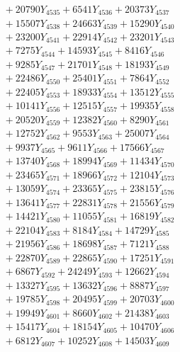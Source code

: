 \documentclass[a4paper,10pt]{article}
\begin{document}
{\begin{align}
&\;  + 20790 Y_{4535} + 6541 Y_{4536} + 20373 Y_{4537} \\[0.3ex]
&\;  + 15507 Y_{4538} + 24663 Y_{4539} + 15290 Y_{4540} \\[0.3ex]
&\;  + 23200 Y_{4541} + 22914 Y_{4542} + 23201 Y_{4543} \\[0.3ex]
&\;  + 7275 Y_{4544} + 14593 Y_{4545} + 8416 Y_{4546} \\[0.3ex]
&\;  + 9285 Y_{4547} + 21701 Y_{4548} + 18193 Y_{4549} \\[0.3ex]
&\;  + 22486 Y_{4550} + 25401 Y_{4551} + 7864 Y_{4552} \\[0.3ex]
&\;  + 22405 Y_{4553} + 18933 Y_{4554} + 13512 Y_{4555} \\[0.3ex]
&\;  + 10141 Y_{4556} + 12515 Y_{4557} + 19935 Y_{4558} \\[0.5ex]\allowbreak
&\;  + 20520 Y_{4559} + 12382 Y_{4560} + 8290 Y_{4561} \\[0.3ex]
&\;  + 12752 Y_{4562} + 9553 Y_{4563} + 25007 Y_{4564} \\[0.3ex]
&\;  + 9937 Y_{4565} + 9611 Y_{4566} + 17566 Y_{4567} \\[0.3ex]
&\;  + 13740 Y_{4568} + 18994 Y_{4569} + 11434 Y_{4570} \\[0.3ex]
&\;  + 23465 Y_{4571} + 18966 Y_{4572} + 12104 Y_{4573} \\[0.3ex]
&\;  + 13059 Y_{4574} + 23365 Y_{4575} + 23815 Y_{4576} \\[0.3ex]
&\;  + 13641 Y_{4577} + 22831 Y_{4578} + 21556 Y_{4579} \\[0.3ex]
&\;  + 14421 Y_{4580} + 11055 Y_{4581} + 16819 Y_{4582} \\[0.3ex]
&\;  + 22104 Y_{4583} + 8184 Y_{4584} + 14729 Y_{4585} \\[0.3ex]
&\;  + 21956 Y_{4586} + 18698 Y_{4587} + 7121 Y_{4588} \\[0.5ex]\allowbreak
&\;  + 22870 Y_{4589} + 22865 Y_{4590} + 17251 Y_{4591} \\[0.3ex]
&\;  + 6867 Y_{4592} + 24249 Y_{4593} + 12662 Y_{4594} \\[0.3ex]
&\;  + 13327 Y_{4595} + 13632 Y_{4596} + 8887 Y_{4597} \\[0.3ex]
&\;  + 19785 Y_{4598} + 20495 Y_{4599} + 20703 Y_{4600} \\[0.3ex]
&\;  + 19949 Y_{4601} + 8660 Y_{4602} + 21438 Y_{4603} \\[0.3ex]
&\;  + 15417 Y_{4604} + 18154 Y_{4605} + 10470 Y_{4606} \\[0.3ex]
&\;  + 6812 Y_{4607} + 10252 Y_{4608} + 14503 Y_{4609} \\[0.3ex]

\end{align}}
\end{document}
